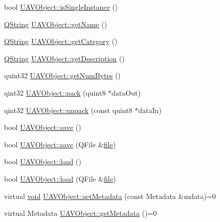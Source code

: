 \begin{DoxyCompactItemize}
bool \hyperlink{group___u_a_v_objects_plugin_gac05d3c2bd0fd07947707562f66ddfc18}{\-U\-A\-V\-Object\-::is\-Single\-Instance} ()
\item 
\hyperlink{group___u_a_v_objects_plugin_gab9d252f49c333c94a72f97ce3105a32d}{\-Q\-String} \hyperlink{group___u_a_v_objects_plugin_ga92eb502fc16ba82b924a430acaa55f46}{\-U\-A\-V\-Object\-::get\-Name} ()
\item 
\hyperlink{group___u_a_v_objects_plugin_gab9d252f49c333c94a72f97ce3105a32d}{\-Q\-String} \hyperlink{group___u_a_v_objects_plugin_gae829aa2dbab661a65f9f805caa8c67d1}{\-U\-A\-V\-Object\-::get\-Category} ()
\item 
\hyperlink{group___u_a_v_objects_plugin_gab9d252f49c333c94a72f97ce3105a32d}{\-Q\-String} \hyperlink{group___u_a_v_objects_plugin_ga319c487a42b628a2e83274c89fa77625}{\-U\-A\-V\-Object\-::get\-Description} ()
\item 
quint32 \hyperlink{group___u_a_v_objects_plugin_gafa1288a7ab0b65c3f81c4312d7cfee78}{\-U\-A\-V\-Object\-::get\-Num\-Bytes} ()
\item 
qint32 \hyperlink{group___u_a_v_objects_plugin_ga4afcaf928b2868be5a57d96a2b251318}{\-U\-A\-V\-Object\-::pack} (quint8 $\ast$data\-Out)
\item 
qint32 \hyperlink{group___u_a_v_objects_plugin_ga4ec5169680d4a03161752e98fd98a3b6}{\-U\-A\-V\-Object\-::unpack} (const quint8 $\ast$data\-In)
\item 
bool \hyperlink{group___u_a_v_objects_plugin_ga7c5e9973653217674183bfa3ba10e217}{\-U\-A\-V\-Object\-::save} ()
\item 
bool \hyperlink{group___u_a_v_objects_plugin_ga6b936966d89fb80b1138100edcd3e4cc}{\-U\-A\-V\-Object\-::save} (\-Q\-File \&\hyperlink{uavobjecttemplate_8m_a97c04efa65bcf0928abf9260bc5cbf46}{file})
\item 
bool \hyperlink{group___u_a_v_objects_plugin_ga8e49ecfdebf22f4834d1fc22d3effae7}{\-U\-A\-V\-Object\-::load} ()
\item 
bool \hyperlink{group___u_a_v_objects_plugin_ga0c4bcaec65373c03a2dbf22beae1e8a3}{\-U\-A\-V\-Object\-::load} (\-Q\-File \&\hyperlink{uavobjecttemplate_8m_a97c04efa65bcf0928abf9260bc5cbf46}{file})
\item 
virtual \hyperlink{group___u_a_v_objects_plugin_ga444cf2ff3f0ecbe028adce838d373f5c}{void} \hyperlink{group___u_a_v_objects_plugin_ga6cca5e5bf5d4f7ecfb03ef7cc9a93a95}{\-U\-A\-V\-Object\-::set\-Metadata} (const \-Metadata \&mdata)=0
\item 
virtual \-Metadata \hyperlink{group___u_a_v_objects_plugin_gaadeb5af3a70679bcb2b6360274e9c7de}{\-U\-A\-V\-Object\-::get\-Metadata} ()=0

\end{DoxyCompactItemize}
